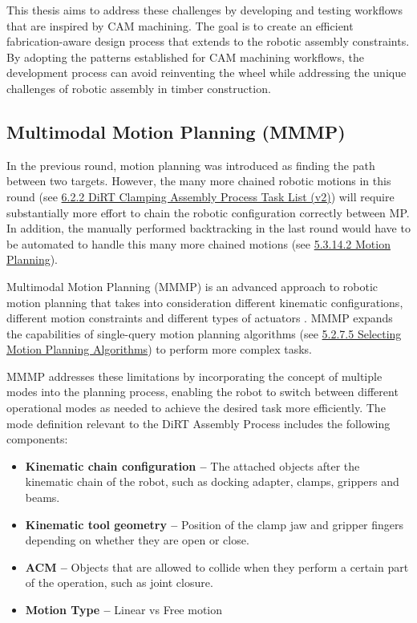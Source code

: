 This thesis aims to address these challenges by developing and testing workflows that are inspired by CAM machining. The goal is to create an efficient fabrication-aware design process that extends to the robotic assembly constraints. By adopting the patterns established for CAM machining workflows, the development process can avoid reinventing the wheel while addressing the unique challenges of robotic assembly in timber construction.

\vspace{2\baselineskip}
\subsection{Multimodal Motion Planning (MMMP)}

In the previous round, motion planning was introduced as finding the path between two targets. However, the many more chained robotic motions in this round (see \ul{6.2.2 DiRT Clamping Assembly Process Task List (v2)}) will require substantially more effort to chain the robotic configuration correctly between MP. In addition, the manually performed backtracking in the last round would have to be automated to handle this many more chained motions (see \ul{5.3.14.2 Motion Planning}). 

Multimodal Motion Planning (MMMP) is an advanced approach to robotic motion planning that takes into consideration different kinematic configurations, different motion constraints and different types of actuators \parencite{hauserMultimodalMotionPlanning2010, hauserRandomizedMultimodalMotion2011}. MMMP expands the capabilities of single-query motion planning algorithms (see \ul{5.2.7.5 Selecting Motion Planning Algorithms}) to perform more complex tasks.

MMMP addresses these limitations by incorporating the concept of multiple modes into the planning process, enabling the robot to switch between different operational modes as needed to achieve the desired task more efficiently. The mode definition relevant to the DiRT Assembly Process includes the following components:

\begin{itemize}
	\item \textbf{Kinematic chain configuration --} The attached objects after the kinematic chain of the robot, such as docking adapter, clamps, grippers and beams.
	\item \textbf{Kinematic tool geometry --} Position of the clamp jaw and gripper fingers depending on whether they are open or close.
	\item \textbf{ACM --} Objects that are allowed to collide when they perform a certain part of the operation, such as joint closure.
	\item \textbf{Motion Type --} Linear vs Free motion
\end{itemize}

